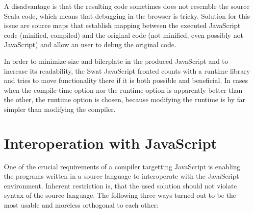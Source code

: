\documentclass[12pt,a4paper]{report}
\begin{document}
A disadvantage is that the resulting code sometimes does not resemble the source Scala code, which means that debugging in the browser is tricky. Solution for this issue are source maps\cite{SourceMaps} that establish mapping between the executed JavaScript code (minified, compiled) and the original code (not minified, even possibly not JavaScript) and allow an user to debug the original code.

In order to minimize size and bilerplate in the produced JavaScript and to increase its readability, the Swat JavaScript fronted counts with a runtime library and tries to move functionality there if it is both possible and beneficial. In cases when the compile-time option nor the runtime option is apparently better than the other, the runtime option is chosen, because modifying the runtime is by far simpler than modifying the compiler.

\section{Interoperation with JavaScript}

One of the crucial requirements of a compiler targetting JavaScript is enabling the programs written in a source language to interoperate with the JavaScript environment. Inherent restriction is, that the used solution should not violate syntax of the source language. The following three ways turned out to be the most usable and moreless orthogonal to each other: 
\end{document}
